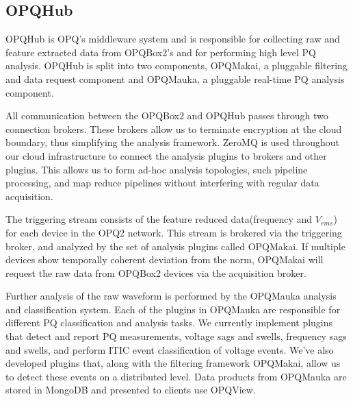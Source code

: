 \documentclass[a4paper, conference]{IEEEtran}
\begin{document}
\subsection{OPQHub}
OPQHub is OPQ's middleware system and is responsible for collecting raw and feature extracted data from OPQBox2's and for performing high level PQ analysis.  OPQHub is split into two components, OPQMakai, a pluggable filtering and data request component and OPQMauka, a pluggable real-time PQ analysis component.

All communication between the OPQBox2 and OPQHub passes through two connection brokers. These brokers allow us to terminate encryption at the cloud boundary, thus simplifying the analysis framework. ZeroMQ is used throughout our cloud infrastructure to connect the analysis plugins to brokers and other plugins. This allows us to form ad-hoc analysis topologies, such pipeline processing, and map reduce pipelines without interfering with regular data acquisition.

The triggering stream consists of the feature reduced data(frequency and $V_{rms}$) for each device in the OPQ2 network. This stream is brokered via the triggering broker, and analyzed by the set of analysis plugins called OPQMakai. If multiple devices show temporally coherent deviation from the norm, OPQMakai will request the raw data from OPQBox2 devices via the acquisition broker. 

Further analysis of the raw waveform is performed by  the OPQMauka analysis and classification system. Each of the plugins in OPQMauka are responsible for different PQ classification and analysis tasks. We currently implement plugins that detect and report PQ measurements, voltage sags and swells, frequency sags and swells, and perform ITIC event classification of voltage events. We've also developed plugins that, along with the filtering framework OPQMakai, allow us to detect these events on a distributed level. Data products from OPQMauka are stored in MongoDB and presented to clients use OPQView.


\end{document}
